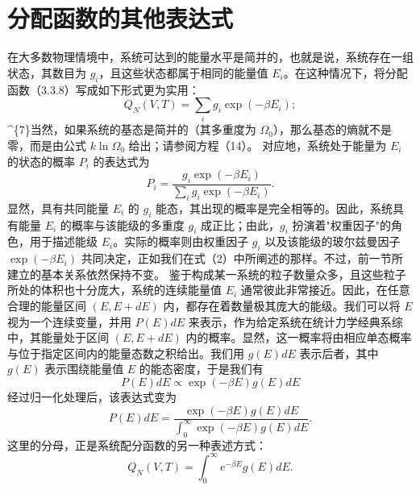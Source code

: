 \section{分配函数的其他表达式}\label{ux5206ux914dux51fdux6570ux7684ux5176ux4ed6ux8868ux8fbeux5f0f}
在大多数物理情境中，系统可达到的能量水平是简并的，也就是说，系统存在一组状态，其数目为 \(g_i\)，且这些状态都属于相同的能量值 \(E_i\)。在这种情况下，将分配函数（3.3.8）写成如下形式更为实用：
\begin{equation}\tag{3.3.16}\label{eq:3.3.16}
Q _ { N } ( V , T ) = \sum _ { i } g _ { i } \exp ( - \beta E _ { i } ) ;
\end{equation}
\^{}\{7\}当然，如果系统的基态是简并的（其多重度为 \(\Omega_{0}\)），那么基态的熵就不是零，而是由公式 \(k \ln \Omega_{0}\) 给出；请参阅方程（14）。
对应地，系统处于能量为 \(E_{i}\) 的状态的概率 \(P_{i}\) 的表达式为
\begin{equation}\tag{3.3.17}\label{eq:3.3.17}
P _ { i } = \frac { g _ { i } \exp ( - \beta E _ { i } ) } { \sum _ { i } g _ { i } \exp ( - \beta E _ { i } ) } .
\end{equation}
显然，具有共同能量 \(E_{i}\) 的 \(g_{i}\) 能态，其出现的概率是完全相等的。因此，系统具有能量 \(E_{i}\) 的概率与该能级的多重度 \(g_{i}\) 成正比；由此，\(g_{i}\) 扮演着"权重因子"的角色，用于描述能级 \(E_{i}\)。实际的概率则由权重因子 \(g_{i}\) 以及该能级的玻尔兹曼因子 \(\exp(-\beta E_{i})\) 共同决定，正如我们在式（2）中所阐述的那样。不过，前一节所建立的基本关系依然保持不变。
鉴于构成某一系统的粒子数量众多，且这些粒子所处的体积也十分庞大，系统的连续能量值 \(E_{i}\) 通常彼此非常接近。因此，在任意合理的能量区间 \((E, E + dE)\) 内，都存在着数量极其庞大的能级。我们可以将 \(E\) 视为一个连续变量，并用 \(P(E)dE\) 来表示，作为给定系统在统计力学经典系综中，其能量处于区间 \((E, E + dE)\) 内的概率。显然，这一概率将由相应单态概率与位于指定区间内的能量态数之积给出。我们用 \(g(E)dE\) 表示后者，其中 \(g(E)\) 表示围绕能量值 \(E\) 的能态密度，于是我们有
\begin{equation}\tag{3.3.18}\label{eq:3.3.18}
P ( E ) d E \propto \exp ( - \beta E ) g ( E ) d E
\end{equation}
经过归一化处理后，该表达式变为
\begin{equation}\tag{3.3.19}\label{eq:3.3.19}
P ( E ) d E = \frac { \exp ( - \beta E ) g ( E ) d E } { \int _ { 0 } ^{\infty} \exp ( - \beta E ) g ( E ) d E } .
\end{equation}
这里的分母，正是系统配分函数的另一种表述方式：
\begin{equation}\tag{3.3.20}\label{eq:3.3.20}
Q _ { N } ( V , T ) = \int _ { 0 } ^{\infty} e ^{- \beta E} g ( E ) d E .
\end{equation}
